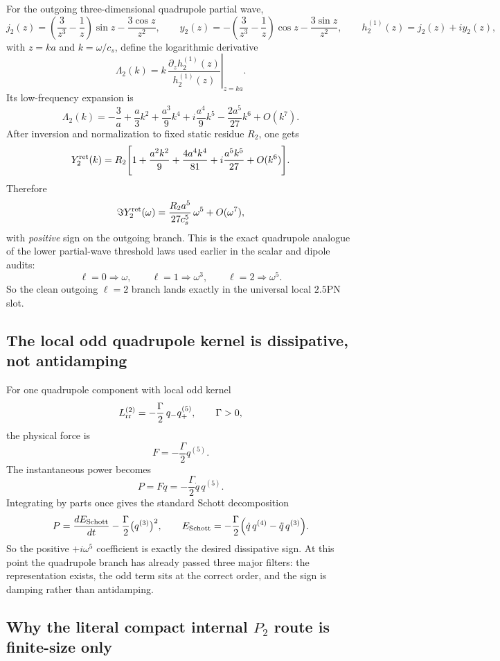 \documentclass[11pt]{article}
\begin{document}
For the outgoing three-dimensional quadrupole partial wave,
\[
j_2(z)=\left(\frac{3}{z^3}-\frac{1}{z}\right)\sin z-\frac{3\cos z}{z^2},
\qquad
y_2(z)=-\left(\frac{3}{z^3}-\frac{1}{z}\right)\cos z-\frac{3\sin z}{z^2},
\qquad
h_2^{(1)}(z)=j_2(z)+iy_2(z),
\]
with $z=ka$ and $k=\omega/c_s$, define the logarithmic derivative
\[
\Lambda_2(k)
=\left.k\,\frac{\partial_z h_2^{(1)}(z)}{h_2^{(1)}(z)}\right|_{z=ka}.
\]
Its low-frequency expansion is
\[
\Lambda_2(k)
=
-\frac{3}{a}
+\frac{a}{3}k^2
+\frac{a^3}{9}k^4
+i\frac{a^4}{9}k^5
-\frac{2a^5}{27}k^6
+O(k^7).
\]
After inversion and normalization to fixed static residue $R_2$, one gets
\[
Y_2^{\rm ret}(k)
=
R_2\Biggl[
1+\frac{a^2k^2}{9}
+\frac{4a^4k^4}{81}
+i\frac{a^5k^5}{27}
+O(k^6)
\Biggr].
\]
Therefore
\[
\Im Y_2^{\rm ret}(\omega)
=
\frac{R_2a^5}{27c_s^5}\,\omega^5+O(\omega^7),
\]
with \emph{positive} sign on the outgoing branch.  This is the exact
quadrupole analogue of the lower partial-wave threshold laws used earlier in
the scalar and dipole audits:
\[
\ell=0\Rightarrow \omega,
\qquad
\ell=1\Rightarrow \omega^3,
\qquad
\ell=2\Rightarrow \omega^5.
\]
So the clean outgoing $\ell=2$ branch lands exactly in the universal local
$2.5$PN slot.

\subsection{The local odd quadrupole kernel is dissipative, not antidamping}
\label{app:quad-ledger-damping}

For one quadrupole component with local odd kernel
\[
L_{\rm rr}^{(2)}=-\frac{\Gamma}{2}\,q_-q_+^{(5)},
\qquad \Gamma>0,
\]
the physical force is
\[
F=-\frac{\Gamma}{2}q^{(5)}.
\]
The instantaneous power becomes
\[
P=F\dot q=-\frac{\Gamma}{2}\dot q\,q^{(5)}.
\]
Integrating by parts once gives the standard Schott decomposition
\[
P
=
\frac{dE_{\rm Schott}}{dt}
-\frac{\Gamma}{2}\bigl(q^{(3)}\bigr)^2,
\qquad
E_{\rm Schott}
=-\frac{\Gamma}{2}\Bigl(\dot q\,q^{(4)}-\ddot q\,q^{(3)}\Bigr).
\]
So the positive $+i\omega^5$ coefficient is exactly the desired dissipative
sign.  At this point the quadrupole branch has already passed three major
filters: the representation exists, the odd term sits at the correct order, and
the sign is damping rather than antidamping.

\subsection{Why the literal compact internal \texorpdfstring{$P_2$}{P\_2} route is finite-size only}
\label{app:quad-ledger-finite-size}
\end{document}
